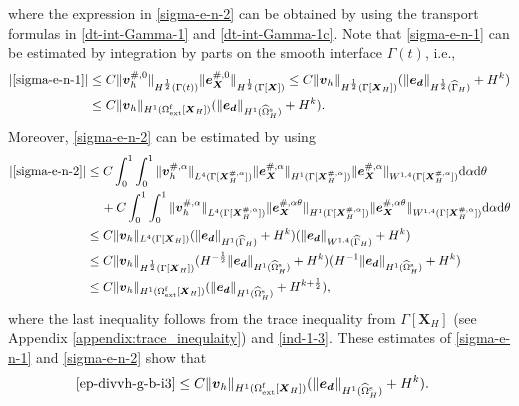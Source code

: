 \documentclass[11pt,reqno]{amsart}
\theoremstyle{definition}
\theoremstyle{plain}
\numberwithin{theorem}{section}
\numberwithin{proposition}{section}
\numberwithin{lemma}{section}
\numberwithin{equation}{section}
\newcommand{\bs}[1]{\boldsymbol{#1}}
\def\d{\mathrm{d}}
\renewcommand{\(}{\bigl(}
\renewcommand{\)}{\bigr)}
\begin{document}
where the expression in \eqref{sigma-e-n-2} can be obtained by using the transport formulas in \eqref{dt-int-Gamma-1} and \eqref{dt-int-Gamma-1c}. Note that \eqref{sigma-e-n-1} can be estimated by integration by parts on the smooth interface $\Gamma(t)$, i.e., 
\begin{align}
|\eqref{sigma-e-n-1}|
&\le C\|{\bs v}_h^{\#,0}\|_{H^{\frac12}(\Gamma(t))} 
\|{\bs e}_{\bs X}^{\#,0}\|_{H^{\frac12}(\Gamma[\bs X])} \le C\|{\bs v}_h\|_{H^{\frac12}(\Gamma[{\bs X}_H])} 
(\|{\bs e}_{\bs d}\|_{H^{\frac12}(\widehat\Gamma_H)} + H^k) \notag\\
&\le C\|{\bs v}_h\|_{H^1(\Omega^{\rm f}_{\rm ext}[{\bs X}_H])} 
(\|{\bs e}_{\bs d}\|_{H^1(\widehat\Omega^{\rm s}_H)} + H^k) .
\end{align}
Moreover, \eqref{sigma-e-n-2} can be estimated by using 
\begin{align}
|\eqref{sigma-e-n-2}|
&\le C\int_0^1\int_0^1\|{\bs v}_h^{\#,\alpha}\|_{L^4(\Gamma[{\bs X}_H^{\#,\alpha}])} 
\|{\bs e}_{\bs X}^{\#,\alpha}\|_{H^1(\Gamma[{\bs X}_H^{\#,\alpha}])} 
\|{\bs e}_{\bs X}^{\#,\alpha}\|_{W^{1,4}(\Gamma[{\bs X}_H^{\#,\alpha}])} \d\alpha\d\theta \notag\\
&\quad\, 
+ C\int_0^1\int_0^1\|{\bs v}_h^{\#,\alpha}\|_{L^4(\Gamma[{\bs X}_H^{\#,\alpha}])} \|{\bs e}_{\bs X}^{\#,\alpha\theta}\|_{H^1(\Gamma[{\bs X}_H^{\#,\alpha}])} 
\|{\bs e}_{\bs X}^{\#,\alpha\theta}\|_{W^{1,4}(\Gamma[{\bs X}_H^{\#,\alpha}])} \d\alpha\d\theta\notag\\
&\le C\|{\bs v}_h\|_{L^4(\Gamma[{\bs X}_H])} 
(\|{\bs e}_{\bs d}\|_{H^1(\widehat\Gamma_H)} + H^k)
(\|{\bs e}_{\bs d}\|_{W^{1,4}(\widehat\Gamma_H)} + H^k) \notag\\
&\le C\|{\bs v}_h\|_{H^{\frac12}(\Gamma[{\bs X}_H])} 
(H^{-\frac12}\|{\bs e}_{\bs d}\|_{H^1(\widehat\Omega^{\rm s}_H)} + H^k)
(H^{-1}\|{\bs e}_{\bs d}\|_{H^1(\widehat\Omega^{\rm s}_H)} + H^k) \notag\\
&\le C\|{\bs v}_h\|_{H^1(\Omega^{\rm f}_{\rm ext}[{\bs X}_H])} 
(\|{\bs e}_{\bs d}\|_{H^1(\widehat\Omega^{\rm s}_H)} + H^{k+\frac12}) ,
\end{align}
where the last inequality follows from the trace inequality from $\Gamma[{\bs X}_H]$ (see Appendix \ref{appendix:trace_inequlaity}) and \eqref{ind-1-3}. These estimates of \eqref{sigma-e-n-1} and \eqref{sigma-e-n-2} show that
\begin{align}\label{ep-divvh-g-b-j2}
\eqref{ep-divvh-g-b-i3} 
&\le C\|{\bs v}_h\|_{H^1(\Omega^{\rm f}_{\rm ext}[{\bs X}_H])} 
(\|{\bs e}_{\bs d}\|_{H^1(\widehat\Omega^{\rm s}_H)} + H^{k}) .
\end{align} 
\end{document}
